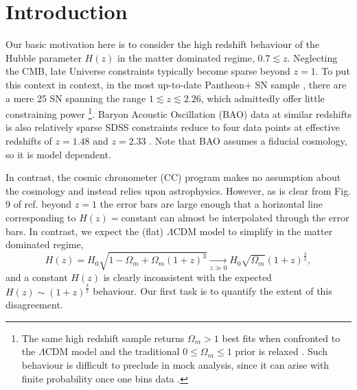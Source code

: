 \documentclass[aps,prl,10pt,twocolumn,superscriptaddress, nofootinbib]{revtex4}
\def\be{\begin{equation}}
\def\ee{\end{equation}}
\begin{document}
\section{Introduction} 
Our basic motivation here is to consider the high redshift behaviour of the Hubble parameter $H(z)$ in the matter dominated regime, $0.7 \lesssim z$. Neglecting the CMB, late Universe constraints typically become sparse beyond $z = 1$. To put this context in context, in the most up-to-date Pantheon+ SN sample \cite{Scolnic:2021amr, Brout:2022vxf}, there are a mere 25 SN spanning the range $1 \lesssim z \lesssim 2.26$, which admittedly offer little constraining power \footnote{The same high redshift sample returns $\Omega_m > 1$ best fits when confronted to the $\Lambda$CDM model and the traditional $0 \leq \Omega_m \leq 1$ prior is relaxed \cite{Malekjani:2023dky}. Such behaviour is difficult to preclude in mock analysis, since it can arise with finite probability once one bins data \cite{Colgain:2022tql}.}. Baryon Acoustic Oscillation (BAO) data at similar redshifts is also relatively sparse SDSS constraints reduce to four data points at effective redshifts of $z = 1.48$ \cite{Hou:2020rse, Neveux:2020voa} and $z = 2.33$  \cite{duMasdesBourboux:2020pck}. Note that BAO assumes a fiducial cosmology, so it is model dependent. 

In contrast, the cosmic chronometer (CC) program \cite{Jimenez:2001gg} makes no assumption about the cosmology and instead relies upon astrophysics. However, as is clear from Fig. 9 of ref.  \cite{Tomasetti:2023kek} beyond $z=1$ the error bars are large enough that a horizontal line corresponding to $H(z) = \textrm{constant}$ can almost be interpolated through the error bars. In contrast, we expect the (flat) $\Lambda$CDM model to simplify in the matter dominated regime, 
\be
H(z) = H_0 \sqrt{1-\Omega_m + \Omega_m (1+z)^3} \xrightarrow[z \gg 0]{} H_0 \sqrt{\Omega_m} (1+z)^{\frac{3}{2}}, 
\ee
and a constant $H(z)$ is clearly inconsistent with the expected $H(z) \sim (1+z)^{\frac{3}{2}}$ behaviour. Our first task is to quantify the extent of this disagreement. 
\end{document}
